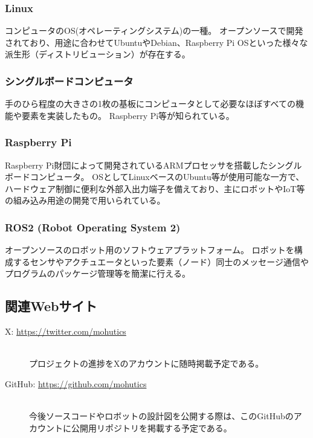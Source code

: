 \documentclass[uplatex,a4paper,12pt]{jsarticle}
\begin{document}
\subsubsection*{Linux \label{term:linux}}
コンピュータのOS(オペレーティングシステム)の一種。
オープンソースで開発されており、用途に合わせてUbuntuやDebian、Raspberry Pi OSといった様々な派生形（ディストリビューション）が存在する。


\subsubsection*{シングルボードコンピュータ \label{term:sbc}}
手のひら程度の大きさの1枚の基板にコンピュータとして必要なほぼすべての機能や要素を実装したもの。
Raspberry Pi等が知られている。

\subsubsection*{Raspberry Pi \label{term:raspi}}
Raspberry Pi財団によって開発されているARMプロセッサを搭載したシングルボードコンピュータ。
OSとしてLinuxベースのUbuntu等が使用可能な一方で、ハードウェア制御に便利な外部入出力端子を備えており、主にロボットやIoT等の組み込み用途の開発で用いられている。

\subsubsection*{ROS2 (Robot Operating System 2) \label{term:ros2}}
オープンソースのロボット用のソフトウェアプラットフォーム。
ロボットを構成するセンサやアクチュエータといった要素（ノード）同士のメッセージ通信やプログラムのパッケージ管理等を簡潔に行える。

\subsection{関連Webサイト}
\begin{description}
  \item[X: \url{https://twitter.com/mohutics}]\mbox{}\\
  プロジェクトの進捗をXのアカウントに随時掲載予定である。
  \item[GitHub: \url{https://github.com/mohutics}]\mbox{}\\
  今後ソースコードやロボットの設計図を公開する際は、このGitHubのアカウントに公開用リポジトリを掲載する予定である。
\end{description}







\end{document}
